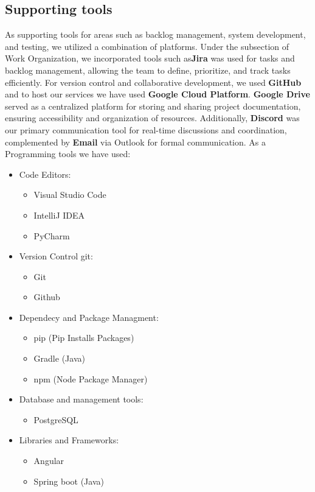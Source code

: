 \subsection{Supporting tools}
As supporting tools for areas such as backlog management, system development, and testing, we utilized a combination of platforms. Under the subsection of Work Organization, we incorporated tools such as\textbf{Jira} was used for tasks and backlog management, allowing the team to define, prioritize, and track tasks efficiently. For version control and collaborative development, we used \textbf{GitHub} and to host our services we have used \textbf{Google Cloud Platform}. \textbf{Google Drive} served as a centralized platform for storing and sharing project documentation, ensuring accessibility and organization of resources. Additionally, \textbf{Discord} was our primary communication tool for real-time discussions and coordination, complemented by \textbf{Email} via Outlook for formal communication. As a Programming tools we have used:

\begin{itemize}
    \item Code Editors:
        \begin{itemize}
            \item Visual Studio Code
            \item IntelliJ IDEA
            \item PyCharm
        \end{itemize}
        \item Version Control git:
        \begin{itemize}
            \item Git
            \item Github
        \end{itemize}
        \item Dependecy and Package Managment:
        \begin{itemize}
            \item pip (Pip Installs Packages)
            \item Gradle (Java)
            \item npm (Node Package Manager)
        \end{itemize}
        \item Database and management tools:
        \begin{itemize}
            \item PostgreSQL
        \end{itemize}
        \item {Libraries and Frameworks:}
\begin{itemize}
    \item Angular   
    \item Spring boot (Java)
\end{itemize}
\end{itemize}

